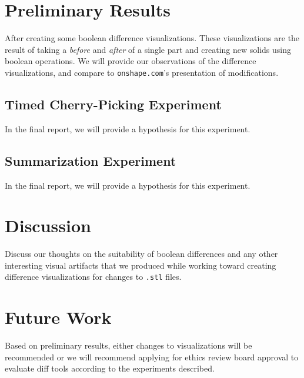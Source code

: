 \documentclass[sigconf,authorversion,nonacm]{acmart}
\begin{document}
\section{Preliminary Results}

After creating some boolean difference visualizations. These visualizations are the result of taking a \emph{before} and \emph{after} of a single part and creating new solids using boolean operations.
We will provide our observations of the difference visualizations, and compare to \texttt{onshape.com}'s presentation of modifications.

\subsection{Timed Cherry-Picking Experiment}
In the final report, we will provide a hypothesis for this experiment.

\subsection{Summarization Experiment}
In the final report, we will provide a hypothesis for this experiment.

\section{Discussion}

Discuss our thoughts on the suitability of boolean differences and any other interesting visual artifacts that we produced while working toward creating difference visualizations for changes to \texttt{.stl} files.

\section{Future Work}

Based on preliminary results, either changes to visualizations will be recommended or we will recommend applying for ethics review board approval to evaluate diff tools according to the experiments described.



\appendix
\end{document}
